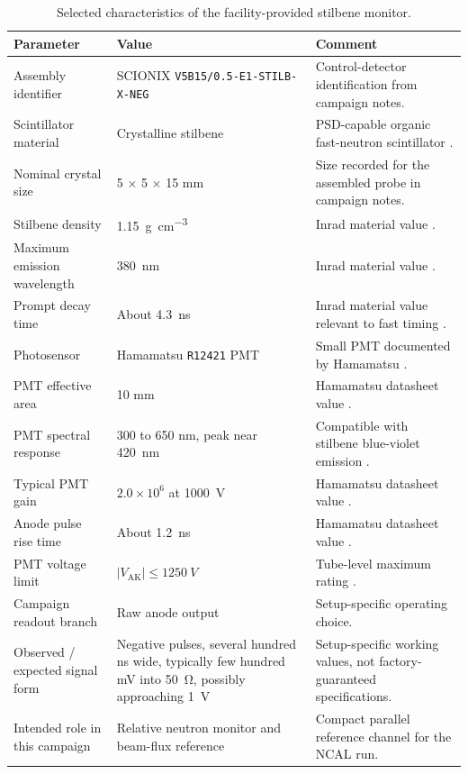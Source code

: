\begin{table}[htbp]
\centering
\caption{Selected characteristics of the facility-provided stilbene monitor.}
\label{tab:scionix-stilbene-specs}
\footnotesize
\setlength{\tabcolsep}{4pt}
\renewcommand{\arraystretch}{1.02}
\begin{tabularx}{\textwidth}{>{\raggedright\arraybackslash}p{3.8cm}YY}
\toprule
Parameter & Value & Comment \\
\midrule
Assembly identifier & SCIONIX \texttt{V5B15/0.5-E1-STILB-X-NEG} & Control-detector identification from campaign notes. \\
Scintillator material & Crystalline stilbene & PSD-capable organic fast-neutron scintillator \citep{InradStilbeneNote,ScionixNeutronScintillatorNote}. \\
Nominal crystal size & 5 $\times$ 5 $\times$ 15 mm & Size recorded for the assembled probe in campaign notes. \\
Stilbene density & \SI{1.15}{\gram\per\centi\meter\cubed} & Inrad material value \citep{InradStilbeneNote}. \\
Maximum emission wavelength & \SI{380}{nm} & Inrad material value \citep{InradStilbeneNote}. \\
Prompt decay time & About \SI{4.3}{ns} & Inrad material value relevant to fast timing \citep{InradStilbeneNote}. \\
Photosensor & Hamamatsu \texttt{R12421} PMT & Small PMT documented by Hamamatsu \citep{HamamatsuR12421Manual}. \\
PMT effective area & 10 mm & Hamamatsu datasheet value \citep{HamamatsuR12421Manual}. \\
PMT spectral response & 300 to 650 nm, peak near \SI{420}{nm} & Compatible with stilbene blue-violet emission \citep{HamamatsuR12421Manual}. \\
Typical PMT gain & $2.0\times10^{6}$ at \SI{1000}{V} & Hamamatsu datasheet value \citep{HamamatsuR12421Manual}. \\
Anode pulse rise time & About \SI{1.2}{ns} & Hamamatsu datasheet value \citep{HamamatsuR12421Manual}. \\
PMT voltage limit & $|V_{\mathrm{AK}}| \leq \SI{1250}{V}$ & Tube-level maximum rating \citep{HamamatsuR12421Manual}. \\
Campaign readout branch & Raw anode output & Setup-specific operating choice. \\
Observed / expected signal form & Negative pulses, several hundred ns wide, typically few hundred mV into \SI{50}{\ohm}, possibly approaching \SI{1}{V} & Setup-specific working values, not factory-guaranteed specifications. \\
Intended role in this campaign & Relative neutron monitor and beam-flux reference & Compact parallel reference channel for the NCAL run. \\
\bottomrule
\end{tabularx}
\end{table}